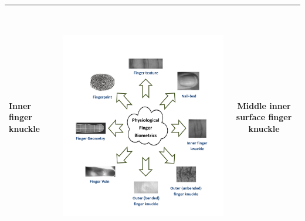 \documentclass[review]{elsarticle}
\begin{document}
\begin{table}[h]
{\begin{tabular}{|C{3.7cm}|C{3.7cm}|c|}
			\textbf{Inner finger knuckle}&~~ \begin{minipage}{0.75\hsize}\includegraphics[page=1,scale=.5,trim=20.7cm 12.8cm 1.5cm 13.6cm,clip]{Finger_biometrics.pdf}\end{minipage} & Middle inner surface finger knuckle \\ \hline

\end{tabular}}
\end{table}
\end{document}

